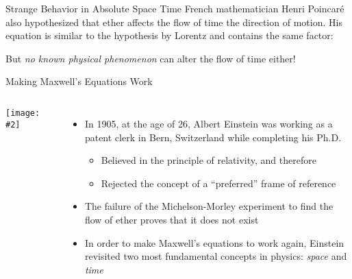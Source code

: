 \documentclass[12pt,compress,aspectratio=169]{beamer}
\newcommand{\pic}[2]{\texttt{[image: \#2]}}
\newcommand{\bigsqrt}{\ensuremath\sqrt{1-\left(\frac{v}{c}\right)^2}}
\newcommand{\eq}[2]{\vspace{#1}{\Large\begin{displaymath}#2\end{displaymath}}}
\begin{document}
\begin{frame}{Strange Behavior in Absolute Space Time}
  French mathematician Henri Poincar\'{e} also hypothesized that ether affects
  the flow of time the direction of motion. His equation is similar to the
  hypothesis by Lorentz and contains the same factor:

  \eq{-.2in}{
    \boxed{t' =\frac{t}{\bigsqrt}}
  }
  
  But \emph{no known physical phenomenon} can alter the flow of time either!

\end{frame}



\begin{frame}{Making Maxwell's Equations Work}
  \begin{columns}
    \pic{1.1}{graphics/Einstein_patentoffice.png}
    \begin{center}
      \vspace{-.15in}{\footnotesize Albert Einstein\\ in 1905\par}
    \end{center}
    
    \begin{itemize}
    \item In 1905, at the age of 26, Albert Einstein was working as a patent
      clerk in Bern, Switzerland while completing his Ph.D.
      \begin{itemize}
      \item Believed in the principle of relativity, and therefore
      \item Rejected the concept of a ``preferred'' frame of reference
      \end{itemize}
    \item The failure of the Michelson-Morley experiment to find the flow of
      ether proves that it does not exist
    \item In order to make Maxwell's equations to work again, Einstein
      revisited two most fundamental concepts in physics: \emph{space} and
      \emph{time}
    \end{itemize}
  \end{columns}
\end{frame}
\end{document}

